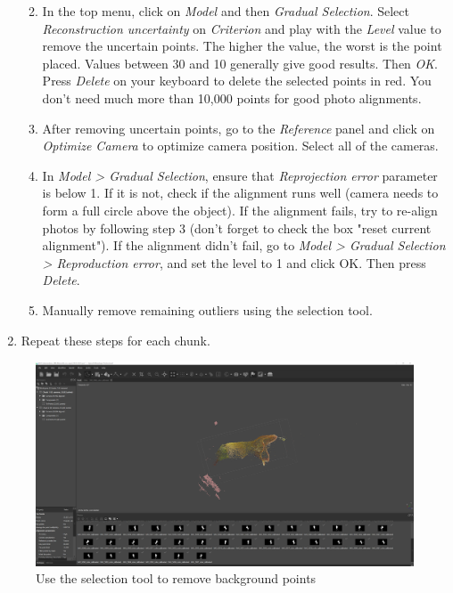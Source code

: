 \documentclass[
]{book}
\theoremstyle{definition}
\theoremstyle{definition}
\theoremstyle{definition}
\theoremstyle{definition}
\theoremstyle{remark}
\begin{document}
\begin{enumerate}
  \begin{enumerate}
  \def\labelenumii{\arabic{enumii}.}
  \item
    In the top menu, click on \emph{Model} and then \emph{Gradual Selection}.
    Select \emph{Reconstruction uncertainty} on \emph{Criterion} and play with
    the \emph{Level} value to remove the uncertain points. The higher the
    value, the worst is the point placed. Values between 30 and 10
    generally give good results. Then \emph{OK}. Press \emph{Delete} on your
    keyboard to delete the selected points in red. You don't need
    much more than 10,000 points for good photo alignments.
  \item
    After removing uncertain points, go to the \emph{Reference} panel and
    click on \emph{Optimize Camera} to optimize camera position. Select
    all of the cameras.
  \item
    In \emph{Model \textgreater{} Gradual Selection}, ensure that \emph{Reprojection
    error} parameter is below 1. If it is not, check if the
    alignment runs well (camera needs to form a full circle above
    the object). If the alignment fails, try to re-align photos by
    following step 3 (don't forget to check the box "reset current
    alignment"). If the alignment didn't fail, go to \emph{Model \textgreater{}
    Gradual Selection \textgreater{} Reproduction error}, and set the level to 1
    and click OK. Then press \emph{Delete}.
  \item
    Manually remove remaining outliers using the selection tool.
  \end{enumerate}
\item
  Repeat these steps for each chunk.
\end{enumerate}

\begin{figure}
\hypertarget{model_orientation1}{%
\centering
\includegraphics[width=1\textwidth,height=\textheight]{Figures/metashape_delete_selectedpoints.png}
\caption{Use the selection tool to remove background
points}\label{model_orientation1}
}
\end{figure}
\end{document}
